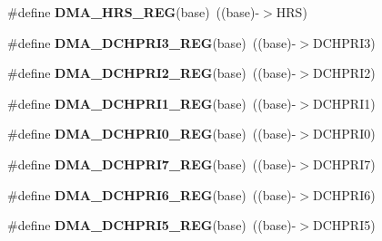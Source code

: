 \begin{DoxyCompactItemize}
\item 
\#define {\bfseries D\+M\+A\+\_\+\+H\+R\+S\+\_\+\+R\+EG}(base)~((base)-\/$>$H\+RS)\hypertarget{group__DMA__Register__Accessor__Macros_ga96f169a5241ae368b33d95d1191e0bf4}{}\label{group__DMA__Register__Accessor__Macros_ga96f169a5241ae368b33d95d1191e0bf4}

\item 
\#define {\bfseries D\+M\+A\+\_\+\+D\+C\+H\+P\+R\+I3\+\_\+\+R\+EG}(base)~((base)-\/$>$D\+C\+H\+P\+R\+I3)\hypertarget{group__DMA__Register__Accessor__Macros_ga2bf8a4f6d4a9e3754e4f86278536d8cb}{}\label{group__DMA__Register__Accessor__Macros_ga2bf8a4f6d4a9e3754e4f86278536d8cb}

\item 
\#define {\bfseries D\+M\+A\+\_\+\+D\+C\+H\+P\+R\+I2\+\_\+\+R\+EG}(base)~((base)-\/$>$D\+C\+H\+P\+R\+I2)\hypertarget{group__DMA__Register__Accessor__Macros_gae1b4c758a6fbb34e7eac26ce130107c9}{}\label{group__DMA__Register__Accessor__Macros_gae1b4c758a6fbb34e7eac26ce130107c9}

\item 
\#define {\bfseries D\+M\+A\+\_\+\+D\+C\+H\+P\+R\+I1\+\_\+\+R\+EG}(base)~((base)-\/$>$D\+C\+H\+P\+R\+I1)\hypertarget{group__DMA__Register__Accessor__Macros_ga9918ca0b50c6a964c0f4228c84cf477a}{}\label{group__DMA__Register__Accessor__Macros_ga9918ca0b50c6a964c0f4228c84cf477a}

\item 
\#define {\bfseries D\+M\+A\+\_\+\+D\+C\+H\+P\+R\+I0\+\_\+\+R\+EG}(base)~((base)-\/$>$D\+C\+H\+P\+R\+I0)\hypertarget{group__DMA__Register__Accessor__Macros_ga17996564e21436bae440bb781b62fc01}{}\label{group__DMA__Register__Accessor__Macros_ga17996564e21436bae440bb781b62fc01}

\item 
\#define {\bfseries D\+M\+A\+\_\+\+D\+C\+H\+P\+R\+I7\+\_\+\+R\+EG}(base)~((base)-\/$>$D\+C\+H\+P\+R\+I7)\hypertarget{group__DMA__Register__Accessor__Macros_ga540cf71e563a3d9d3dc0970180446af1}{}\label{group__DMA__Register__Accessor__Macros_ga540cf71e563a3d9d3dc0970180446af1}

\item 
\#define {\bfseries D\+M\+A\+\_\+\+D\+C\+H\+P\+R\+I6\+\_\+\+R\+EG}(base)~((base)-\/$>$D\+C\+H\+P\+R\+I6)\hypertarget{group__DMA__Register__Accessor__Macros_gadf0f16c0482d6d150b387594d51bf4d9}{}\label{group__DMA__Register__Accessor__Macros_gadf0f16c0482d6d150b387594d51bf4d9}

\item 
\#define {\bfseries D\+M\+A\+\_\+\+D\+C\+H\+P\+R\+I5\+\_\+\+R\+EG}(base)~((base)-\/$>$D\+C\+H\+P\+R\+I5)\hypertarget{group__DMA__Register__Accessor__Macros_ga3373d6ba11904a8d56852f1f8364eb10}{}\label{group__DMA__Register__Accessor__Macros_ga3373d6ba11904a8d56852f1f8364eb10}


\end{DoxyCompactItemize}
